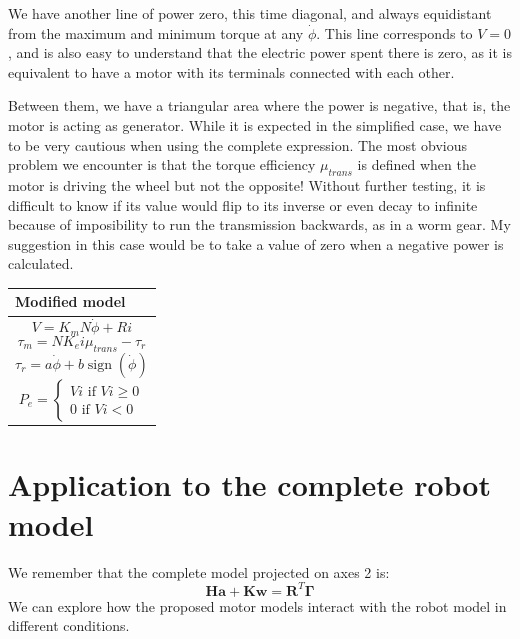 \documentclass[12pt]{article}
\renewcommand{\vec}[1]{\bm{#1}}
\newcommand{\R}{\mathbb R}
\def\R{\vec R}
\begin{document}
We have another line of power zero, this time diagonal, and always equidistant from the maximum and minimum torque at any $\dot{\phi}$. This line corresponds to $V = 0$, and is also easy to understand that the electric power spent there is zero, as it is equivalent to have a motor with its terminals connected with each other.

Between them, we have a triangular area where the power is negative, that is, the motor is acting as generator. While it is expected in the simplified case, we have to be very cautious when using the complete expression. The most obvious problem we encounter is that the torque efficiency $\mu_{trans}$ is defined when the motor is driving the wheel but not the opposite! Without further testing, it is difficult to know if its value would flip to its inverse or even decay to infinite because of imposibility to run the transmission backwards, as in a worm gear. My suggestion in this case would be to take a value of zero when a negative power is calculated.
\begin{center}
	\begin{tabular}{ | m{14em} | } 
		\hline
		Modified model \\ 
		\hline
		$$ V = K_m N\dot{\phi} + Ri$$
		$$ \tau_m = N K_ei\mu_{trans} - \tau_r$$
		$$ \tau_r = a \dot{\phi} + b \operatorname{sign}(\dot{\phi}) $$
		$$ P_{e}=\begin{cases}
		Vi \text{  if  } Vi\geq 0\\
		0 \text{  if  } Vi < 0
		\end{cases}$$\\
		
		\hline
	\end{tabular}
\end{center}


\section*{Application to the complete robot model}

We remember that the complete model projected on axes 2 is:
$$\vec{H} \vec a+\vec K\vec w=\R^T\vec\Gamma$$
We can explore how the proposed motor models interact with the robot model in different conditions.
\end{document}
